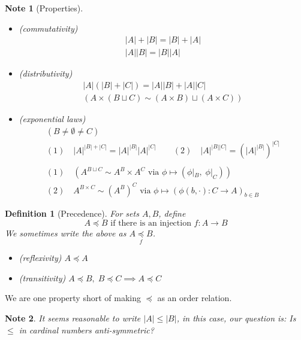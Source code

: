\documentclass[11pt, oneside]{book}
\theoremstyle{break}
\newtheorem*{note}{Note}
\newtheorem{defn}{Definition}[section]
\begin{document}
\begin{note}[Properties]
	\begin{itemize}
		\item (commutativity) \begin{gather*}
			|A| + |B| = |B| + |A| \\
			|A||B| = |B||A|
		\end{gather*}

		\item (distributivity) \begin{gather*}
			|A|(|B| + |C|) = |A||B| + |A||C| \\
			\left( A \times (B \sqcup C) \sim (A \times B) \sqcup (A \times C) \right)
		\end{gather*}

		\item (exponential laws) \begin{gather*}
			(B \neq \emptyset \neq C) \\
			(1) \quad |A|^{|B| + |C|} = |A|^{|B|} |A|^{|C|} \qquad (2) \quad |A|^{|B||C|} = \left( |A|^{|B|} \right)^{|C|} \\
			\\
			(1) \quad \left( A^{B \sqcup C} \sim A^B \times A^C \text{ via } \phi \mapsto (\phi|_B, \; \phi|_C) \right) \\
			(2) \quad A^{B \times C} \sim (A^B)^C \text{ via } \phi \mapsto (\phi(b, \cdot) : C \to A)_{b \in B}
		\end{gather*}

	\end{itemize}
\end{note}

\begin{defn}[Precedence]
	For sets $A, B$, define
	\begin{equation*}
		A \preceq B \text{ if there is an injection } f: A \to B
	\end{equation*}
	We sometimes write the above as $A \underset{f}{\preceq} B$.

	\begin{itemize}
		\item (reflexivity) $A \preceq A$
		\item (transitivity) $A \preceq B, \; B \preceq C \implies A \preceq C$
	\end{itemize}
\end{defn}

We are one property short of making $\preceq$ as an order relation.

\begin{note}
	It seems reasonable to write $|A| \leq |B|$, in this case, our question is: Is $\leq$ in cardinal numbers anti-symmetric?
\end{note}
\end{document}
